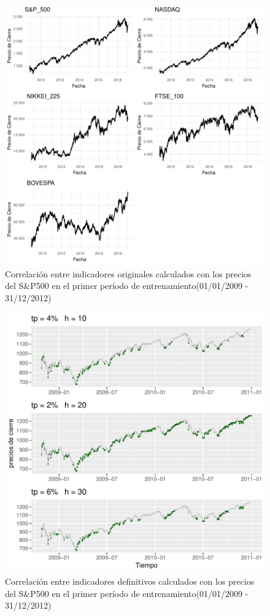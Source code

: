 \documentclass[a4paper,12pt]{Latex/Classes/PhDthesisPSnPDF}
\begin{document}
\begin{figure}[H]
\centering
\includegraphics{main-005}
\caption{Correlación entre indicadores originales calculados con los precios del S\&P500 en el primer período de entrenamiento(01/01/2009 - 31/12/2012)}
\end{figure}


\begin{figure}[H]
\centering
\includegraphics{main-006}
\caption{Correlación entre indicadores definitivos calculados con los precios del S\&P500 en el primer período de entrenamiento(01/01/2009 - 31/12/2012)}
\end{figure}
\end{document}
